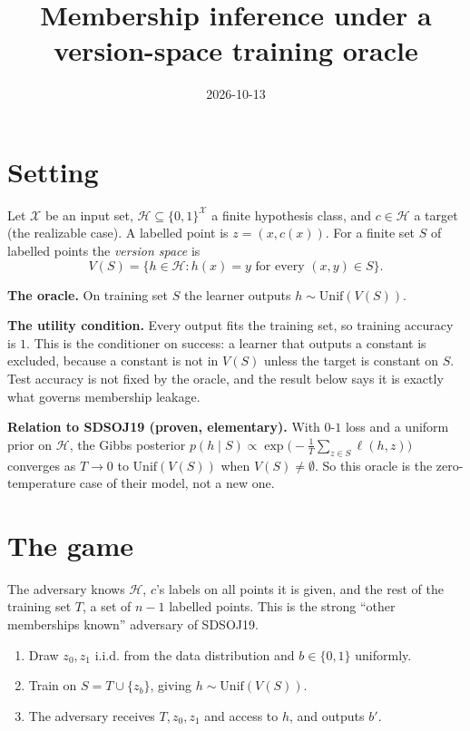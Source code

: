 \documentclass[
]{article}
\title{Membership inference under a version-space training oracle}
\author{}
\date{2026-10-13}
\providecommand{\tightlist}{%
  \setlength{\itemsep}{0pt}\setlength{\parskip}{0pt}}
\begin{document}
\maketitle

\section{Setting}\label{setting}

Let \(\mathcal{X}\) be an input set,
\(\mathcal{H} \subseteq \{0,1\}^{\mathcal{X}}\) a finite hypothesis
class, and \(c \in \mathcal{H}\) a target (the realizable case). A
labelled point is \(z = (x, c(x))\). For a finite set \(S\) of labelled
points the \emph{version space} is
\[V(S) = \{ h \in \mathcal{H} : h(x) = y \text{ for every } (x,y) \in S \}.\]

\textbf{The oracle.} On training set \(S\) the learner outputs
\(h \sim \mathrm{Unif}(V(S))\).

\textbf{The utility condition.} Every output fits the training set, so
training accuracy is \(1\). This is the conditioner on success: a
learner that outputs a constant is excluded, because a constant is not
in \(V(S)\) unless the target is constant on \(S\). Test accuracy is not
fixed by the oracle, and the result below says it is exactly what
governs membership leakage.

\textbf{Relation to SDSOJ19 (proven, elementary).} With \(0\)-\(1\) loss
and a uniform prior on \(\mathcal{H}\), the Gibbs posterior
\(p(h \mid S) \propto \exp\big(-\tfrac{1}{T}\sum_{z \in S} \ell(h,z)\big)\)
converges as \(T \to 0\) to \(\mathrm{Unif}(V(S))\) when
\(V(S) \neq \emptyset\). So this oracle is the zero-temperature case of
their model, not a new one.

\section{The game}\label{the-game}

The adversary knows \(\mathcal{H}\), \(c\)'s labels on all points it is
given, and the rest of the training set \(T\), a set of \(n-1\) labelled
points. This is the strong ``other memberships known'' adversary of
SDSOJ19.

\begin{enumerate}
\def\labelenumi{\arabic{enumi}.}
\tightlist
\item
  Draw \(z_0, z_1\) i.i.d. from the data distribution and
  \(b \in \{0,1\}\) uniformly.
\item
  Train on \(S = T \cup \{z_b\}\), giving
  \(h \sim \mathrm{Unif}(V(S))\).
\item
  The adversary receives \(T, z_0, z_1\) and access to \(h\), and
  outputs \(b'\).
\end{enumerate}
\end{document}
